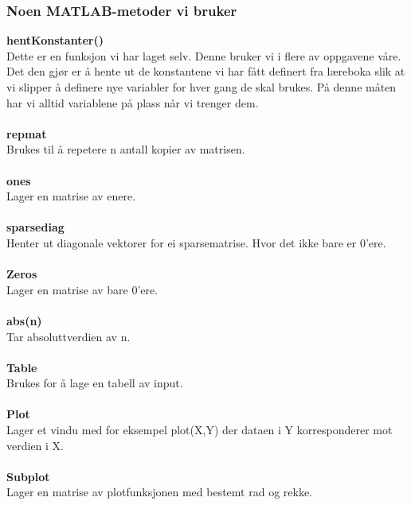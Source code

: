 \subsubsection{Noen MATLAB-metoder vi bruker}
\textbf{hentKonstanter()}\\
Dette er en funksjon vi har laget selv. Denne bruker vi i flere av oppgavene våre. Det den gjør er å hente ut de konstantene vi har fått definert fra læreboka slik at vi slipper å definere nye variabler for hver gang de skal brukes. På denne måten har vi alltid variablene på plass når vi trenger dem.\\
\\
\textbf{repmat}\\
Brukes til å repetere n antall kopier av matrisen.\\
\\
\textbf{ones}\\
Lager en matrise av enere.\\
\\
\textbf{sparsediag}\\
Henter ut diagonale vektorer for ei sparsematrise. Hvor det ikke bare er 0’ere.\\
\\
\textbf{Zeros}\\
Lager en matrise av bare 0’ere.\\
\\
\textbf{abs(n)}\\
Tar absoluttverdien av n.\\
\\
\textbf{Table}\\
Brukes for å lage en tabell av input.\\
\\
\textbf{Plot}\\
Lager et vindu med for eksempel plot(X,Y) der dataen i Y korresponderer mot verdien i X.\\
\\
\textbf{Subplot}\\
Lager en matrise av plotfunksjonen med bestemt rad og rekke.